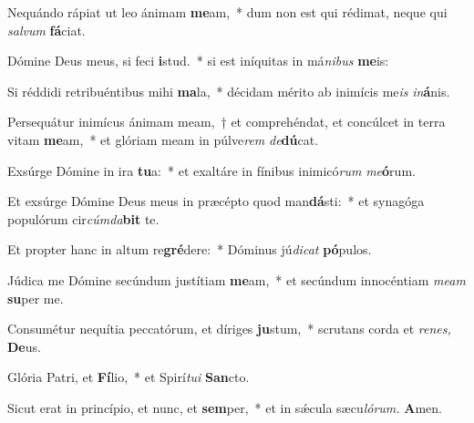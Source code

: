\item Nequándo rápiat ut leo ánimam \textbf{me}am,~* dum non est qui rédimat, neque qui \textit{salvum} \textbf{fá}ciat.
\item Dómine Deus meus, si feci \textbf{i}stud.~* si est iníquitas in má\textit{nibus} \textbf{me}is:
\item Si réddidi retribuéntibus mihi \textbf{ma}la,~* décidam mérito ab inimícis me\textit{is} \textit{in}\textbf{á}nis.
\item Persequátur inimícus ánimam meam,~† et comprehéndat, et concúlcet in terra vitam \textbf{me}am,~* et glóriam meam in púlve\tinyhspace\textit{rem} \textit{de}\textbf{dú}cat.
\item Exsúrge Dómine in ira \textbf{tu}a:~* et exaltáre in fínibus inimicó\textit{rum} \textit{me}\textbf{ó}rum.
\item Et exsúrge Dómine Deus meus in præcépto quod man\textbf{dá}sti:~* et synagóga populórum cir\textit{cúmda}\textbf{bit} te.
\item Et propter hanc in altum re\textbf{gré}dere:~* Dóminus jú\tinyhspace\textit{dicat} \textbf{pó}pulos.
\item Júdica me Dómine secúndum justítiam \textbf{me}am,~* et secúndum innocéntiam \textit{meam} \textbf{su}per me.
\item Consumétur nequítia peccatórum, et díriges \textbf{ju}stum,~* scrutans corda et \textit{renes,} \textbf{De}us.
\item Glória Patri, et \textbf{Fí}lio,~* et Spirí\tinyhspace\textit{tui} \textbf{San}cto.
\item Sicut erat in princípio, et nunc, et \textbf{sem}per,~* et in sǽcula sæcu\tinyhspace\textit{lórum.} \textbf{A}men.
